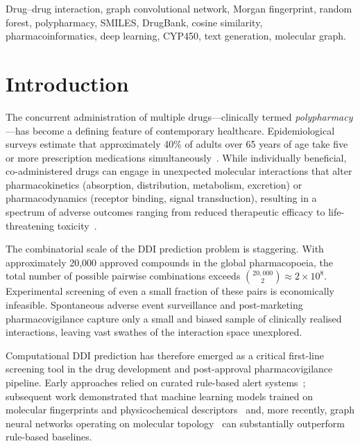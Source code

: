 \documentclass[conference]{IEEEtran}
\begin{document}
\begin{IEEEkeywords}
Drug--drug interaction, graph convolutional network, Morgan fingerprint, random forest,
polypharmacy, SMILES, DrugBank, cosine similarity, pharmacoinformatics, deep learning,
CYP450, text generation, molecular graph.
\end{IEEEkeywords}

\section{Introduction}
\label{sec:intro}

The concurrent administration of multiple drugs---clinically termed \textit{polypharmacy}---has
become a defining feature of contemporary healthcare. Epidemiological surveys estimate that
approximately 40\% of adults over 65 years of age take five or more prescription medications
simultaneously~\cite{hajjar2007polypharmacy}. While individually beneficial, co-administered
drugs can engage in unexpected molecular interactions that alter pharmacokinetics (absorption,
distribution, metabolism, excretion) or pharmacodynamics (receptor binding, signal transduction),
resulting in a spectrum of adverse outcomes ranging from reduced therapeutic efficacy to
life-threatening toxicity~\cite{becker2007ddi}.

The combinatorial scale of the DDI prediction problem is staggering. With approximately
20,000 approved compounds in the global pharmacopoeia, the total number of possible pairwise
combinations exceeds $\binom{20{,}000}{2} \approx 2\times10^8$. Experimental screening of
even a small fraction of these pairs is economically infeasible. Spontaneous adverse event
surveillance and post-marketing pharmacovigilance capture only a small and biased sample of
clinically realised interactions, leaving vast swathes of the interaction space unexplored.

Computational DDI prediction has therefore emerged as a critical first-line screening tool
in the drug development and post-approval pharmacovigilance pipeline. Early approaches relied
on curated rule-based alert systems~\cite{becker2007ddi}; subsequent work demonstrated that
machine learning models trained on molecular fingerprints and physicochemical
descriptors~\cite{vilar2012detection} and, more recently, graph neural networks operating
on molecular topology~\cite{kipf2016semi,gilmer2017mpnn,zitnik2018polypharmacy} can
substantially outperform rule-based baselines.
\end{document}
